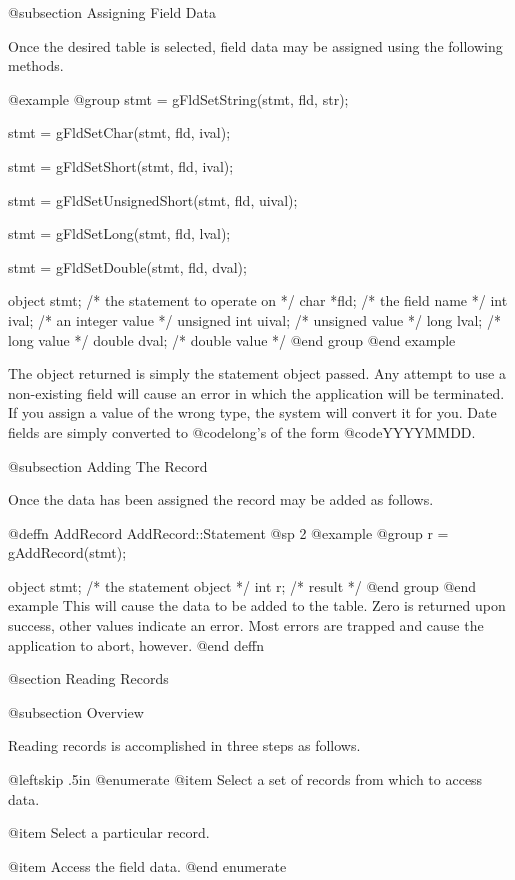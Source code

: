 @subsection Assigning Field Data

Once the desired table is selected, field data may be assigned using the
following methods.

@example
@group
stmt = gFldSetString(stmt, fld, str);

stmt = gFldSetChar(stmt, fld, ival);

stmt = gFldSetShort(stmt, fld, ival);

stmt = gFldSetUnsignedShort(stmt, fld, uival);

stmt = gFldSetLong(stmt, fld, lval);

stmt = gFldSetDouble(stmt, fld, dval);


object  stmt;   /*  the statement to operate on  */
char    *fld;   /*  the field name               */
int     ival;   /*  an integer value             */
unsigned int uival;  /*  unsigned value          */
long    lval;   /*  long value                   */
double  dval;   /*  double value                 */
@end group
@end example

The object returned is simply the statement object passed.  Any attempt
to use a non-existing field will cause an error in which the application
will be terminated.  If you assign a value of the wrong type, the system
will convert it for you.  Date fields are simply converted to @code{long}'s
of the form @code{YYYYMMDD}.

@subsection Adding The Record

Once the data has been assigned the record may be added as follows.

@deffn {AddRecord}  AddRecord::Statement
@sp 2
@example
@group
r = gAddRecord(stmt);

object  stmt;   /*  the statement object  */
int     r;      /*  result                */
@end group
@end example
This will cause the data to be added to the table.  Zero is returned
upon success, other values indicate an error.  Most errors are trapped
and cause the application to abort, however.
@end deffn

@section Reading Records

@subsection Overview

Reading records is accomplished in three steps as follows.

{@leftskip .5in
@enumerate
@item
Select a set of records from which to access data.

@item
Select a particular record.

@item
Access the field data.
@end enumerate
}

